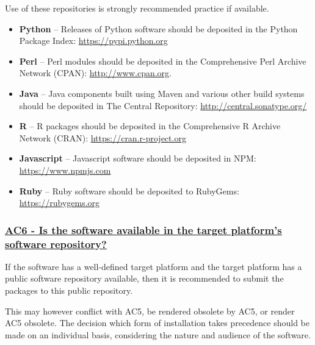 \documentclass[a4paper,11pt]{article}
\newcommand{\criterion}[2]{\subsubsection*{\underline{#1 - #2}}\label{id:#1}}
\newcommand\CheckTable{%
  \begin{tabular}{ccccc}
    No & Minimal & Adequate & Good & Perfect \\
    0 & 1 & 2 & 3 & 4 \\
    \hline
    $\square$ & $\square$ & $\square$ & $\square$ & $\square$ \\
  \end{tabular}%
}
\begin{document}
Use of these repositories is strongly recommended practice if available.

\begin{itemize}
    \item \textbf{Python} -- Releases of Python software should be deposited in
        the Python Package Index: \url{https://pypi.python.org}
    \item \textbf{Perl} --  Perl modules should be deposited in the Comprehensive
        Perl Archive Network (CPAN): \url{http://www.cpan.org}.
    \item \textbf{Java} -- Java components built using Maven and various other
        build systems should be deposited in The Central Repository: \url{http://central.sonatype.org/}
    \item \textbf{R} -- R packages should be deposited in the Comprehensive R
        Archive Network (CRAN): \url{https://cran.r-project.org}
    \item \textbf{Javascript} -- Javascript software should be deposited in
        NPM: \url{https://www.npmjs.com}
    \item \textbf{Ruby} -- Ruby software should be deposited to 
        RubyGems: \url{https://rubygems.org}
\end{itemize}


\newcommand{\acSixID}{AC6}
\newcommand{\acSixText}{Is the software available in the target platform's software repository?}
\criterion{\acSixID}{\acSixText}

If the software has a well-defined target platform and the target platform has
a public software repository available, then it is recommended to submit the
packages to this public repository.

This may however conflict with AC5, be rendered obsolete by AC5, or render AC5
obsolete. The decision which form of installation takes precedence should be
made on an individual basis, considering the nature and audience of the
software.
\end{document}
